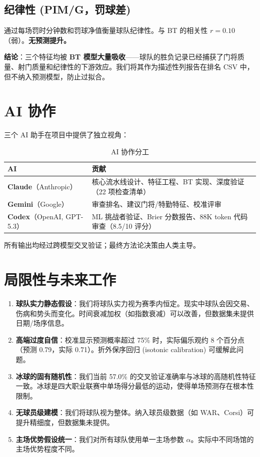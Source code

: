 \documentclass[11pt, a4paper]{article}
\begin{document}
\subsection{纪律性 (PIM/G，罚球差)}
通过每场罚时分钟数和罚球净值衡量球队纪律性。与 BT 的相关性 $r = 0.10$（弱）。\textbf{无预测提升。}

\textbf{结论}：三个特征均被 \textbf{BT 模型大量吸收}——球队的胜负记录已经捕获了门将质量、射门质量和纪律性的下游效应。我们将其作为描述性列报告在排名 CSV 中，但不纳入预测模型，防止过拟合。

\section{AI 协作}
\label{sec:ai}

三个 AI 助手在项目中提供了独立视角：

\begin{table}[H]
\centering
\caption{AI 协作分工}
\begin{tabular}{ll}
\toprule
\textbf{AI} & \textbf{贡献} \\
\midrule
\textbf{Claude}（Anthropic） & 核心流水线设计、特征工程、BT 实现、深度验证（22 项检查清单） \\
\textbf{Gemini}（Google） & 审查排名、建议门将/特勤特征、校准评审 \\
\textbf{Codex}（OpenAI, GPT-5.3） & ML 挑战者验证、Brier 分数报告、88K token 代码审查（8.5/10 评分） \\
\bottomrule
\end{tabular}
\end{table}

\noindent 所有输出均经过跨模型交叉验证；最终方法论决策由人类主导。

\section{局限性与未来工作}
\label{sec:limitations}

\begin{enumerate}
    \item \textbf{球队实力静态假设}：我们将球队实力视为赛季内恒定。现实中球队会因交易、伤病和势头而变化。时间衰减加权（如指数衰减）可以改善，但数据集未提供日期/场序信息。

    \item \textbf{高端过度自信}：校准显示预测概率超过 75\% 时，实际偏乐观约 8 个百分点（预测 0.79，实际 0.71）。折外保序回归 (isotonic calibration) 可缓解此问题。

    \item \textbf{冰球的固有随机性}：我们当前 57.0\% 的交叉验证准确率与冰球的高随机性特征一致。冰球是四大职业联赛中单场得分最低的运动，使得单场预测存在根本性限制。

    \item \textbf{无球员级建模}：我们将球队视为整体。纳入球员级数据（如 WAR、Corsi）可提升精细度，但数据集未提供。

    \item \textbf{主场优势假设统一}：我们对所有球队使用单一主场参数 $\alpha$。实际中不同场馆的主场优势程度不同。
\end{enumerate}
\end{document}
